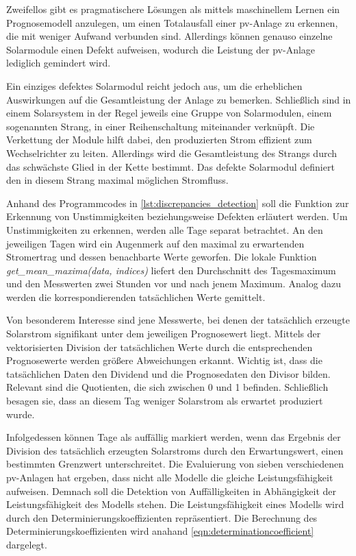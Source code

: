 \documentclass[12pt, a4paper]{article}
\begin{document}
Zweifellos gibt es pragmatischere Lösungen als mittels maschinellem Lernen ein Prognosemodell anzulegen, um einen Totalausfall einer \ac{pv}-Anlage zu erkennen, die mit weniger Aufwand verbunden sind. Allerdings können genauso einzelne Solarmodule einen Defekt aufweisen, wodurch die Leistung der \ac{pv}-Anlage lediglich gemindert wird. 

Ein einziges defektes Solarmodul reicht jedoch aus, um die erheblichen Auswirkungen auf die Gesamtleistung der Anlage zu bemerken. Schließlich sind in einem Solarsystem in der Regel jeweils eine Gruppe von Solarmodulen, einem sogenannten Strang, in einer Reihenschaltung miteinander verknüpft. Die Verkettung der Module hilft dabei, den produzierten Strom effizient zum Wechselrichter zu leiten. Allerdings wird die Gesamtleistung des Strangs durch das schwächste Glied in der Kette bestimmt. Das defekte Solarmodul definiert den in diesem Strang maximal möglichen Stromfluss.

Anhand des Programmcodes in  \autoref{lst:discrepancies_detection} soll die Funktion zur Erkennung von Unstimmigkeiten beziehungsweise Defekten erläutert werden. Um Unstimmigkeiten zu erkennen, werden alle Tage separat betrachtet. An den jeweiligen Tagen wird ein Augenmerk auf den maximal zu erwartenden Stromertrag und dessen benachbarte Werte geworfen. Die lokale Funktion \textit{get\_mean\_maxima(data, indices)} liefert den Durchschnitt des Tagesmaximum und den Messwerten zwei Stunden vor und nach jenem Maximum. Analog dazu werden die korrespondierenden tatsächlichen Werte gemittelt.

Von besonderem Interesse sind jene Messwerte, bei denen der tatsächlich erzeugte Solarstrom signifikant unter dem jeweiligen Prognosewert liegt. Mittels der vektorisierten Division der tatsächlichen Werte durch die entsprechenden Prognosewerte werden größere Abweichungen erkannt. Wichtig ist, dass die tatsächlichen Daten den Dividend und die Prognosedaten den Divisor bilden. Relevant sind die Quotienten, die sich zwischen 0 und 1 befinden. Schließlich besagen sie, dass an diesem Tag weniger Solarstrom als erwartet produziert wurde.

Infolgedessen können Tage als auffällig markiert werden, wenn das Ergebnis der Division des tatsächlich erzeugten Solarstroms durch den Erwartungswert, einen bestimmten Grenzwert unterschreitet. Die Evaluierung von sieben verschiedenen \ac{pv}-Anlagen hat ergeben, dass nicht alle Modelle die gleiche Leistungsfähigkeit aufweisen. Demnach soll die Detektion von Auffälligkeiten in Abhängigkeit der Leistungsfähigkeit des Modells stehen. Die Leistungsfähigkeit eines Modells wird durch den Determinierungskoeffizienten repräsentiert. Die Berechnung des Determinierungskoeffizienten wird anahand \autoref{eqn:determinationcoefficient} dargelegt.
\end{document}
